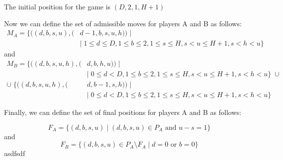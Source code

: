 \documentclass{article}
\begin{document}
The initial position for the game is $(D, 2, 1, H + 1)$

Now we can define the set of admissible moves for players A and B as follows:
\begin{align*}
    M_A =  \{ ((d, b, s, u), ( & d - 1, b, s, u, h)) \; |                                                              \\
                               & | \; 1 \leq d \leq D, 1 \leq b \leq 2, 1 \leq s \leq H, s < u \leq H + 1, s < h < u\}
\end{align*}
and
\begin{align*}
    M_B = \{ ((d, b, s, u, h), (   & d, b, h, u)) \; |                                                                          \\
                                   & | \; 0 \leq d < D, 1 \leq b \leq 2, 1 \leq s \leq H, s < u \leq H + 1, s < h < u\} \; \cup \\
    \cup \; \{ ((d, b, s, u, h), ( & d, b - 1, s, h)) \; |                                                                      \\
                                   & | \; 0 \leq d < D, 1 \leq b \leq 2, 1 \leq s \leq H, s < u \leq H + 1, s < h < u\}
\end{align*}

Finally, we can define the set of final positions for players A and B as
follows:

\[
    F_A = \{ (d, b, s, u) \; | \; (d, b, s, u) \in P_A \text{ and } u - s = 1\}
\]
and
\[
    F_B = \{ (d, b, s, u) \in P_A \setminus F_A \; | \; d = 0 \text{ or } b = 0\}
\]
asdfsdf
\end{document}
